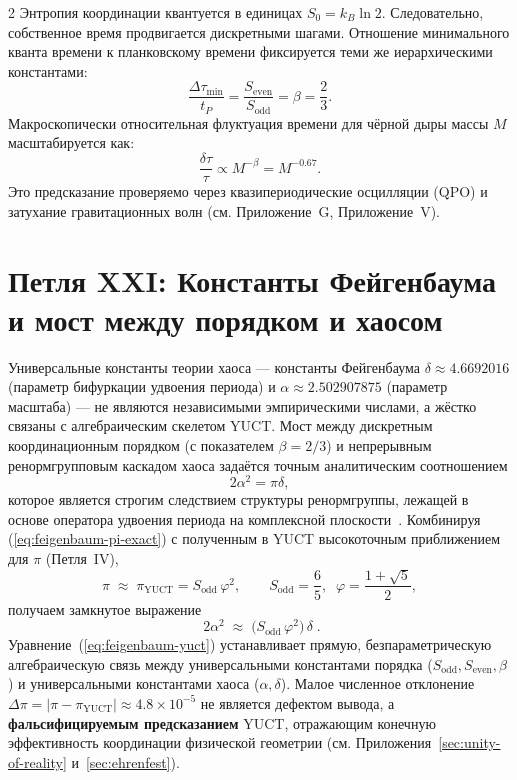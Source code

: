 \documentclass[12pt,a4paper]{article}
\begin{document}
\begin{multicols}{2}
		Энтропия координации квантуется в единицах \(S_0 = k_B \ln 2\). Следовательно, собственное время продвигается дискретными шагами. Отношение минимального кванта времени к планковскому времени фиксируется теми же иерархическими константами:
		\begin{equation}
			\boxed{\frac{\Delta \tau_{\min}}{t_P} = \frac{S_{\mathrm{even}}}{S_{\mathrm{odd}}} = \beta = \frac{2}{3}}.
		\end{equation}
		Макроскопически относительная флуктуация времени для чёрной дыры массы \(M\) масштабируется как:
		\begin{equation}
			\frac{\delta \tau}{\tau} \propto M^{-\beta} = M^{-0.67}.
		\end{equation}
		Это предсказание проверяемо через квазипериодические осцилляции (QPO) и затухание гравитационных волн (см. Приложение~G, Приложение~V).
		
		\section{Петля XXI: Константы Фейгенбаума и мост между порядком и хаосом}
		
		Универсальные константы теории хаоса — константы Фейгенбаума
		\(\delta \approx 4.6692016\) (параметр бифуркации удвоения периода) и
		\(\alpha \approx 2.502907875\) (параметр масштаба) — не являются независимыми эмпирическими числами, а жёстко связаны с алгебраическим скелетом YUCT.
		Мост между дискретным координационным порядком (с показателем \(\beta=2/3\)) и непрерывным ренормгрупповым каскадом хаоса задаётся точным аналитическим соотношением
		\begin{equation}
			2\alpha^2 = \pi \delta,
			\label{eq:feigenbaum-pi-exact}
		\end{equation}
		которое является строгим следствием структуры ренормгруппы, лежащей в основе оператора удвоения периода на комплексной плоскости~\cite{Feigenbaum1978}.
		Комбинируя (\ref{eq:feigenbaum-pi-exact}) с полученным в YUCT высокоточным приближением для \(\pi\) (Петля~IV),
		\begin{equation}
			\pi \;\approx\; \pi_{\mathrm{YUCT}} = S_{\mathrm{odd}}\,\varphi^2,
			\qquad
			S_{\mathrm{odd}} = \frac{6}{5},\;\; \varphi = \frac{1+\sqrt{5}}{2},
		\end{equation}
		получаем замкнутое выражение
		\begin{equation}
			\boxed{\;
				2\alpha^2 \;\approx\; \bigl(S_{\mathrm{odd}}\,\varphi^2\bigr)\,\delta
				\;}.
			\label{eq:feigenbaum-yuct}
		\end{equation}
		Уравнение~(\ref{eq:feigenbaum-yuct}) устанавливает прямую, безпараметрическую алгебраическую связь между универсальными константами порядка (\(S_{\mathrm{odd}}, S_{\mathrm{even}}, \beta\)) и универсальными константами хаоса (\(\alpha, \delta\)). Малое численное отклонение
		\(\Delta\pi = |\pi - \pi_{\mathrm{YUCT}}| \approx 4.8\times10^{-5}\)
		не является дефектом вывода, а \textbf{фальсифицируемым предсказанием} YUCT, отражающим конечную эффективность координации физической геометрии (см. Приложения~\ref{sec:unity-of-reality} и~\ref{sec:ehrenfest}).
		

\end{multicols}
\end{document}
